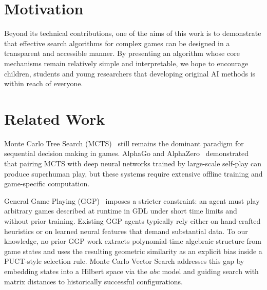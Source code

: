 \documentclass[11pt,a4paper]{article}
\theoremstyle{plain}
\theoremstyle{definition}
\begin{document}
\vspace{0.5em}


\section{Motivation}
\label{sec:motivation}

Beyond its technical contributions, one of the aims of this work is to demonstrate that effective search algorithms for complex games can be designed in a transparent and accessible manner. By presenting an algorithm whose core mechanisms remain relatively simple and interpretable, we hope to encourage children, students and young researchers that developing original AI methods is within reach of everyone.

\vspace{0.5em}


\section{Related Work}
\label{sec:related-work}

\vspace{0.5em}

Monte Carlo Tree Search (MCTS)~\cite{coulom2006efficient,kocsis2006bandit} still remains the dominant paradigm for sequential decision making in games. AlphaGo and AlphaZero~\cite{silver2016mastering,silver2017mastering} demonstrated that pairing MCTS with deep neural networks trained by large-scale self-play can produce superhuman play, but these systems require extensive offline training and game-specific computation.

\vspace{0.5em}

General Game Playing (GGP)~\cite{genesereth2005general,love2006general} imposes a stricter constraint: an agent must play arbitrary games described at runtime in GDL under short time limits and without prior training. Existing GGP agents typically rely either on hand-crafted heuristics or on learned neural features that demand substantial data. To our knowledge, no prior GGP work extracts polynomial-time algebraic structure from game states and uses the resulting geometric similarity as an explicit bias inside a PUCT-style selection rule. Monte Carlo Vector Search addresses this gap by embedding states into a Hilbert space via the \(abc\) model and guiding search with matrix distances to historically successful configurations.
\end{document}
